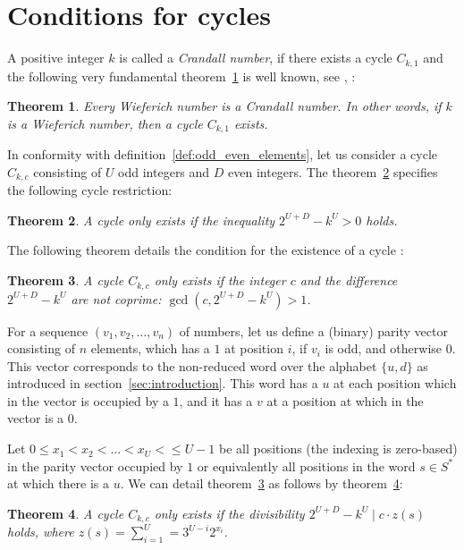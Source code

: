 \documentclass[12pt]{amsart}
\newtheorem{theorem}{Theorem}[section]
\theoremstyle{definition}
\begin{document}
\section{Conditions for cycles}
A positive integer $k$ is called a \textit{Crandall number}, if there exists a cycle $C_{k,1}$ and the following very fundamental theorem~\ref{theo:crandall_wieferich} is well known, see \cite{Ref_Crandall_1978}, \cite{Ref_Franco_Pomerance_1995}:

\begin{theorem}
\label{theo:crandall_wieferich}
Every Wieferich number is a Crandall number. In other words, if $k$ is a Wieferich number, then a cycle $C_{k,1}$ exists.
\end{theorem}

In conformity with definition~\ref{def:odd_even_elements}, let us consider a cycle $C_{k,c}$ consisting of $U$ odd integers and $D$ even integers. The theorem~\ref{theo:cycle_restriction_1} specifies the following cycle restriction:

\begin{theorem}
\label{theo:cycle_restriction_1}
A cycle only exists if the inequality $2^{U+D}-k^U>0$ holds.
\end{theorem}

The following theorem details the condition for the existence of a cycle \cite{Ref_Cox_2012}:

\begin{theorem}
\label{theo:cycle_restriction_2}
A cycle $C_{k,c}$ only exists if the integer $c$ and the difference $2^{U+D}-k^U$ are not coprime: $\gcd(c,2^{U+D}-k^U)>1$.
\end{theorem}

For a sequence $(v_1,v_2,\ldots,v_n)$ of numbers, let us define a (binary) parity vector consisting of $n$ elements, which has a $1$ at position $i$, if $v_i$ is odd, and otherwise $0$. This vector corresponds to the non-reduced word over the alphabet $\{u,d\}$ as introduced in section~\ref{sec:introduction}. This word has a $u$ at each position which in the vector is occupied by a $1$, and it has a $v$ at a position at which in the vector is a $0$.

Let $0\le x_1<x_2<\ldots<x_{U}<\le U-1$ be all positions (the indexing is zero-based) in the parity vector occupied by $1$ or equivalently all positions in the word $s\in S^\ast$ at which there is a $u$. We can detail theorem~\ref{theo:cycle_restriction_2} as follows by theorem~\ref{theo:cycle_restriction_3}:

\begin{theorem}
\label{theo:cycle_restriction_3}
A cycle $C_{k,c}$ only exists if the divisibility $2^{U+D}-k^U\mid c\cdot z(s)$ holds, where $z(s)=\sum_{i=1}^{U}=3^{U-i}2^{x_i}$.
\end{theorem}
\end{document}
